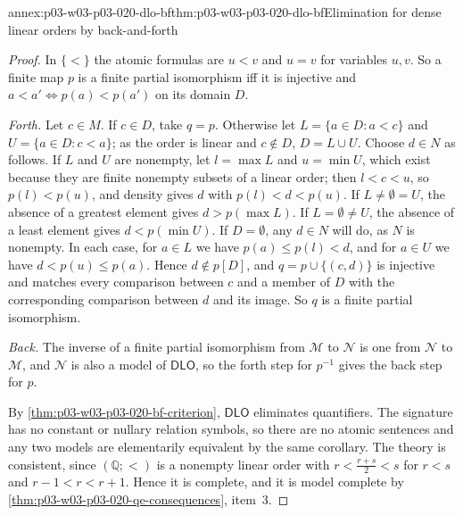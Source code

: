 \begin{annexitem}{annex:p03-w03-p03-020-dlo-bf}{thm:p03-w03-p03-020-dlo-bf}{Elimination for dense linear orders by back-and-forth}
\begin{proof}
In \(\{<\}\) the atomic formulas are \(u<v\) and \(u=v\) for variables
\(u,v\). So a finite map \(p\) is a finite partial isomorphism iff it is
injective and \(a<a'\iff p(a)<p(a')\) on its domain \(D\).

\emph{Forth.} Let \(c\in M\). If \(c\in D\), take \(q=p\). Otherwise let
\(L=\{a\in D:a<c\}\) and \(U=\{a\in D:c<a\}\); as the order is linear and
\(c\notin D\), \(D=L\cup U\). Choose \(d\in N\) as follows.
If \(L\) and \(U\) are nonempty, let \(l=\max L\) and \(u=\min U\), which
exist because they are finite nonempty subsets of a linear order; then
\(l<c<u\), so \(p(l)<p(u)\), and density gives \(d\) with
\(p(l)<d<p(u)\). If \(L\ne\emptyset=U\), the absence of a greatest element
gives \(d>p(\max L)\). If \(L=\emptyset\ne U\), the absence of a least
element gives \(d<p(\min U)\). If \(D=\emptyset\), any \(d\in N\) will do,
as \(N\) is nonempty. In each case, for \(a\in L\) we have
\(p(a)\le p(l)<d\), and for \(a\in U\) we have \(d<p(u)\le p(a)\). Hence
\(d\notin p[D]\), and \(q=p\cup\{(c,d)\}\) is injective and matches every
comparison between \(c\) and a member of \(D\) with the corresponding
comparison between \(d\) and its image. So \(q\) is a finite partial
isomorphism.

\emph{Back.} The inverse of a finite partial isomorphism from
\(\mathcal M\) to \(\mathcal N\) is one from \(\mathcal N\) to
\(\mathcal M\), and \(\mathcal N\) is also a model of \(\mathsf{DLO}\), so
the forth step for \(p^{-1}\) gives the back step for \(p\).

By \cref{thm:p03-w03-p03-020-bf-criterion}, \(\mathsf{DLO}\) eliminates
quantifiers. The signature has no constant or nullary relation symbols, so
there are no atomic sentences and any two models are elementarily
equivalent by the same corollary. The theory is consistent, since
\((\mathbb Q;<)\) is a nonempty linear order with
\(r<\tfrac{r+s}2<s\) for \(r<s\) and \(r-1<r<r+1\). Hence it is complete,
and it is model complete by
\cref{thm:p03-w03-p03-020-qe-consequences}, item~3.
\end{proof}
\end{annexitem}

